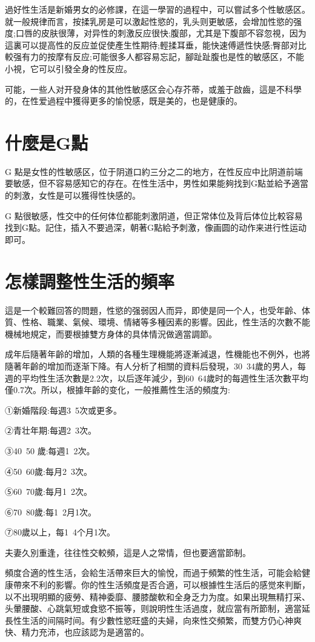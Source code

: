 \documentclass[12pt,UTF8]{ctexbook}
\begin{document}
過好性生活是新婚男女的必修課，在這一學習的過程中，可以嘗試多个性敏感区。就一般規律而言，按揉乳房是可以激起性慾的，乳头则更敏感，会增加性慾的强度;口唇的皮肤很薄，对异性的刺激反应很快;腹部，尤其是下腹部不容忽視，因为這裏可以提高性的反应並促使產生性期待;輕揉耳垂，能快速傅遞性快感;臀部对比較强有力的按摩有反应;可能很多人都容易忘記，腳趾趾腹也是性的敏感区，不能小視，它可以引發全身的性反应。

可能，一些人对开發身体的其他性敏感区会心存芥蒂，或羞于啟齒，這是不科學的，在性爱過程中獲得更多的愉悅感，既是美的，也是健康的。

\section{什麼是G點}

G 點是女性的性敏感区，位于阴道口約三分之二的地方，在性反应中比阴道前端要敏感，但不容易感知它的存在。在性生活中，男性如果能夠找到G點並給予適當的刺激，女性是可以獲得性快感的。

G 點很敏感，性交中的任何体位都能刺激阴道，但正常体位及背后体位比較容易找到G點。記住，插入不要過深，朝著G點給予刺激，像画圆的动作来进行性运动即可。

\section{怎樣調整性生活的頻率}

這是一个較難回答的問題，性慾的强弱因人而异，即使是同一个人，也受年齡、体質、性格、職業、氣候、環境、情緒等多種因素的影響。因此，性生活的次數不能機械地規定，而要根據雙方身体的具体情況做適當調節。

成年后隨著年齡的增加，人類的各種生理機能將逐漸減退，性機能也不例外，也將隨著年齡的增加而逐渐下降。有人分析了相關的資料后發現，30~34歲的男人，每週的平均性生活次數是2.2次，以后逐年減少，到60~64歲时的每週性生活次數平均僅0.7次。所以，根據年齡的变化，一般推薦性生活的頻度为:

①新婚階段:每週3~5次或更多。

②青壮年期:每週2~3次。

③40~50 歲:每週1~2次。

④50~60歲:每月2~3次。

⑤60~70歲:每月1~2次。

⑥70~80歲:每1~2月1次。

⑦80歲以上，每1~4个月1次。

夫妻久別重逢，往往性交較頻，這是人之常情，但也要適當節制。

頻度合適的性生活，会給生活帶來巨大的愉悅，而過于頻繁的性生活，可能会給健康帶來不利的影響。你的性生活頻度是否合適，可以根據性生活后的感觉來判斷，以不出現明顯的疲勞、精神委靡、腰膝酸軟和全身乏力为度。如果出現無精打采、头暈腰酸、心跳氣短或食慾不振等，则說明性生活過度，就应當有所節制，適當延長性生活的间隔时间。有少數性慾旺盛的夫婦，向來性交頻繁，而雙方仍心神爽快、精力充沛，也应該認为是適當的。
\end{document}
